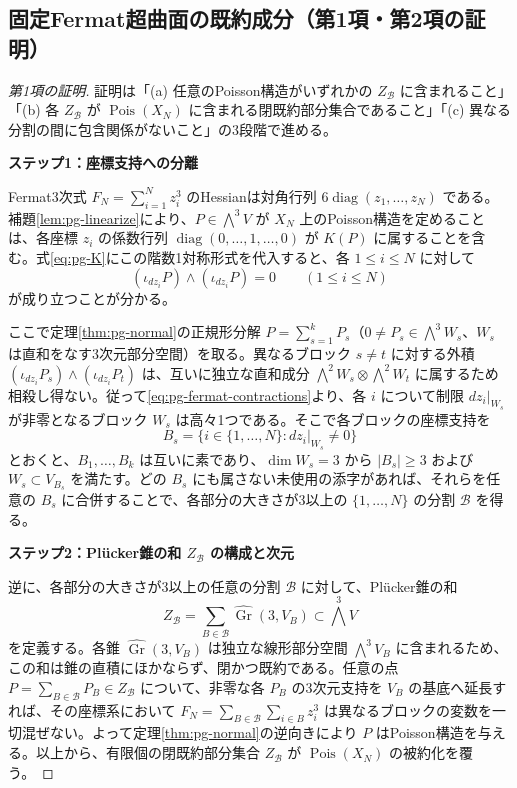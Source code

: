 \subsection{固定Fermat超曲面の既約成分（第1項・第2項の証明）}
\begin{proof}[第1項の証明]
証明は「(a) 任意のPoisson構造がいずれかの $Z_{\mathcal B}$ に含まれること」「(b) 各 $Z_{\mathcal B}$ が $\operatorname{Pois}(X_N)$ に含まれる閉既約部分集合であること」「(c) 異なる分割の間に包含関係がないこと」の3段階で進める。

\par\medskip\noindent\textbf{ステップ1：座標支持への分離}\par\nobreak\smallskip
Fermat3次式 $F_N=\sum_{i=1}^N z_i^3$ のHessianは対角行列 $6\operatorname{diag}(z_1,\ldots,z_N)$ である。補題\ref{lem:pg-linearize}により、$P\in\bigwedge^3V$ が $X_N$ 上のPoisson構造を定めることは、各座標 $z_i$ の係数行列 $\operatorname{diag}(0,\ldots,1,\ldots,0)$ が $K(P)$ に属することを含む。式\eqref{eq:pg-K}にこの階数1対称形式を代入すると、各 $1\le i\le N$ に対して
\begin{equation}\label{eq:pg-fermat-contractions}
(\iota_{dz_i}P)\wedge(\iota_{dz_i}P)=0
 \qquad(1\le i\le N)
\end{equation}
が成り立つことが分かる。

ここで定理\ref{thm:pg-normal}の正規形分解 $P=\sum_{s=1}^k P_s$（$0\ne P_s\in\bigwedge^3W_s$、$W_s$ は直和をなす3次元部分空間）を取る。異なるブロック $s\ne t$ に対する外積 $(\iota_{dz_i}P_s)\wedge(\iota_{dz_i}P_t)$ は、互いに独立な直和成分 $\bigwedge^2W_s\otimes\bigwedge^2W_t$ に属するため相殺し得ない。従って\eqref{eq:pg-fermat-contractions}より、各 $i$ について制限 $dz_i|_{W_s}$ が非零となるブロック $W_s$ は高々1つである。そこで各ブロックの座標支持を
\begin{equation}
B_s=\{i\in\{1,\ldots,N\}:dz_i|_{W_s}\ne0\}
\end{equation}
とおくと、$B_1,\ldots,B_k$ は互いに素であり、$\dim W_s=3$ から $|B_s|\ge3$ および $W_s\subset V_{B_s}$ を満たす。どの $B_s$ にも属さない未使用の添字があれば、それらを任意の $B_s$ に合併することで、各部分の大きさが3以上の $\{1,\ldots,N\}$ の分割 $\mathcal B$ を得る。

\par\medskip\noindent\textbf{ステップ2：Pl\"ucker錐の和 $Z_{\mathcal B}$ の構成と次元}\par\nobreak\smallskip
逆に、各部分の大きさが3以上の任意の分割 $\mathcal B$ に対して、Pl\"ucker錐の和
\begin{equation}
Z_{\mathcal B}=\sum_{B\in\mathcal B}
 \widehat{\operatorname{Gr}}(3,V_B)\subset\bigwedge^3V
\end{equation}
を定義する。各錐 $\widehat{\operatorname{Gr}}(3,V_B)$ は独立な線形部分空間 $\bigwedge^3V_B$ に含まれるため、この和は錐の直積にほかならず、閉かつ既約である。任意の点 $P=\sum_{B\in\mathcal B}P_B\in Z_{\mathcal B}$ について、非零な各 $P_B$ の3次元支持を $V_B$ の基底へ延長すれば、その座標系において $F_N=\sum_{B\in\mathcal B}\sum_{i\in B}z_i^3$ は異なるブロックの変数を一切混ぜない。よって定理\ref{thm:pg-normal}の逆向きにより $P$ はPoisson構造を与える。以上から、有限個の閉既約部分集合 $Z_{\mathcal B}$ が $\operatorname{Pois}(X_N)$ の被約化を覆う。


\end{proof}
